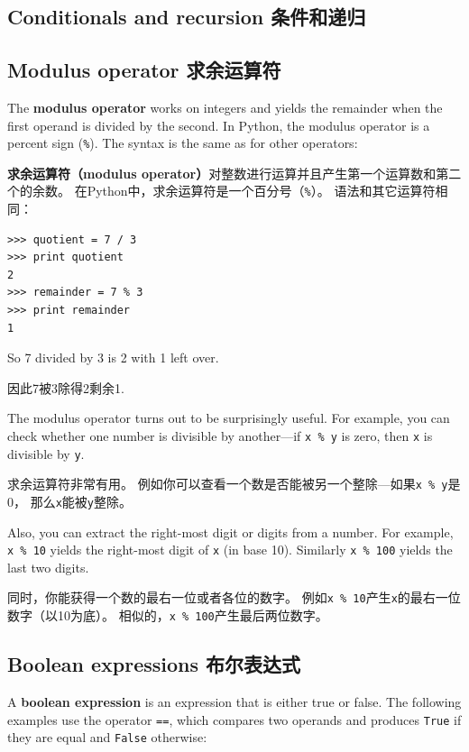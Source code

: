 \documentclass[10pt]{book}
\begin{document}
\begin{CJK}{UTF8}{gbsn}
\chapter{Conditionals and recursion 条件和递归}

\section{Modulus operator 求余运算符}

The {\bf modulus operator} works on integers and yields the remainder
when the first operand is divided by the second.  In Python, the
modulus operator is a percent sign (\verb"%").  The syntax is the same
as for other operators:

{\bf 求余运算符（modulus operator）}对整数进行运算并且产生第一个运算数和第二个的余数。
在Python中，求余运算符是一个百分号（\verb"%"）。
语法和其它运算符相同：

\begin{verbatim}
>>> quotient = 7 / 3
>>> print quotient
2
>>> remainder = 7 % 3
>>> print remainder
1
\end{verbatim}
%
So 7 divided by 3 is 2 with 1 left over.

因此7被3除得2剩余1.

The modulus operator turns out to be surprisingly useful.  For
example, you can check whether one number is divisible by another---if
{\tt x \% y} is zero, then {\tt x} is divisible by {\tt y}.

求余运算符非常有用。
例如你可以查看一个数是否能被另一个整除---如果{\tt x \% y}是0，
那么{\tt x}能被{\tt y}整除。

Also, you can extract the right-most digit
or digits from a number.  For example, {\tt x \% 10} yields the
right-most digit of {\tt x} (in base 10).  Similarly {\tt x \% 100}
yields the last two digits.

同时，你能获得一个数的最右一位或者各位的数字。
例如{\tt x \% 10}产生{\tt x}的最右一位数字（以10为底）。
相似的，{\tt x \% 100}产生最后两位数字。


\section{Boolean expressions 布尔表达式}

A {\bf boolean expression} is an expression that is either true
or false.  The following examples use the 
operator {\tt ==}, which compares two operands and produces
{\tt True} if they are equal and {\tt False} otherwise:


\end{CJK}
\end{document}
